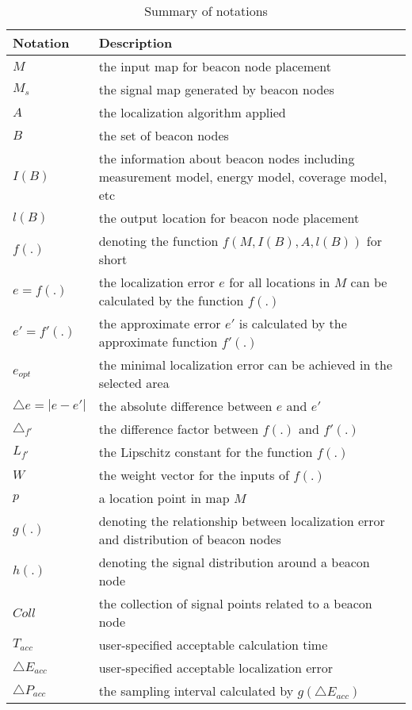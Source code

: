 \documentclass[10pt, conference, letterpaper]{IEEEtran}
\begin{document}
\begin{table}[!t]
\caption{Summary of notations} \label{mc}
\begin{tabularx}{9cm}{|p{2.0cm}|X|}
  \hline
Notation & Description \\
  \hline
  $M$ & the input map for beacon node placement \\
  \hline
  $M_s$ & the signal map generated by beacon nodes \\
  \hline
  $A$ & the localization algorithm applied \\
  \hline
  $B$ & the set of beacon nodes\\
  \hline
  $I(B)$ & the information about beacon nodes including measurement model, energy model, coverage model, etc \\
  \hline
  $l(B)$ & the output location for beacon node placement \\
  \hline
  $f(.)$ & denoting the function $f(M,I(B),A,l(B))$ for short \\
  \hline
  $e=f(.)$ & the localization error $e$ for all locations in $M$ can be calculated by the function $f(.)$ \\
  \hline
  $e'=f'(.)$ & the approximate error $e'$ is calculated by the approximate function $f'(.)$ \\
  \hline
  $e_{opt}$ & the minimal localization error can be achieved in the selected area \\
  \hline
  $\triangle e=|e-e'|$ & the absolute difference between $e$ and $e'$ \\
  \hline
  $\triangle_{f'}$ & the difference factor between $f(.)$ and $f'(.)$ \\
  \hline
  $L_{f'}$ & the Lipschitz constant for the function $f(.)$ \\
  \hline
  $W$ & the weight vector for the inputs of $f(.)$ \\
  \hline
  $p$ & a location point in map $M$ \\
  \hline
  $g(.)$ & denoting the relationship between localization error and distribution of beacon nodes \\
  \hline
  $h(.)$ & denoting the signal distribution around a beacon node \\
  \hline
  $Coll$ & the collection of signal points related to a beacon node \\
  \hline
  $T_{acc}$ & user-specified acceptable calculation time \\
  \hline
  $\triangle E_{acc}$ & user-specified acceptable localization error \\
  \hline
  $\triangle P_{acc}$ & the sampling interval calculated by $g(\triangle E_{acc})$ \\
  \hline
\end{tabularx}
\end{table}
\end{document}

